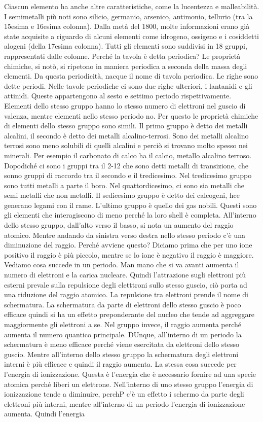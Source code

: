 \documentclass[../AppuntiChimica]{subfiles}
\begin{document}
	Ciascun elemento ha anche altre caratteristiche, come la lucentezza e malleabilità. I semimetalli più noti sono silicio, germanio, arsenico, antimonio, tellurio (tra la 15esima e 16esima colonna). Dalla metà del 1800, molte informazioni erano già state acquisite a riguardo di alcuni elementi come idrogeno, ossigeno e i cosiddetti alogeni (della 17esima colonna). Tutti gli elementi sono suddivisi in 18 gruppi, rappresentati dalle colonne. Perché la tavola è detta periodica? Le proprietà chimiche, si notò, si ripetono in maniera periodica a seconda della massa degli elementi. Da questa periodicità, nacque il nome di tavola periodica. Le righe sono dette periodi. Nelle tavole periodiche ci sono due righe ulteriori, i lantanidi e gli attinidi. Queste appartengono al sesto e settimo periodo rispettivamente. Elementi dello stesso gruppo hanno lo stesso numero di elettroni nel guscio di valenza, mentre elementi nello stesso periodo no. Per questo le proprietà chimiche di elementi dello stesso gruppo sono simili. Il primo gruppo è detto dei metalli alcalini, il secondo è detto dei metalli alcalino-terrosi. Sono dei metalli alcalino terrosi sono meno solubili di quelli alcalini e perciò si trovano molto spesso nei minerali. Per esempio il carbonato di calco ha il calcio, metallo alcalino terroso. Dopodiché ci sono i gruppi tra il 2-12 che sono detti metalli di transizione, che sonno gruppi di raccordo tra il secondo e il tredicesimo. Nel tredicesimo gruppo sono tutti metalli a parte il boro. Nel quattordicesimo, ci sono sia metalli che semi metalli che non metalli. Il sedicesimo gruppo è detto dei calcogeni, hce generano legami con il rame. L'ultimo gruppo è quello dei gas nobili. Questi sono gli elementi che interagiscono di meno perché la loro shell è completa. All'interno dello stesso gruppo, dall'alto verso il basso, si nota un aumento del raggio atomico. Mentre andando da sinistra verso destra nello stesso periodo c'è una diminuzione del raggio. Perché avviene questo? Diciamo prima che per uno ione positivo il raggio è più piccolo, mentre se lo ione è negativo il raggio è maggiore. Vediamo cosa succede in un periodo. Man mano che si va avanti aumenta il numero di elettroni e la carica nucleare. Quindi l'attrazione sugli elettroni più esterni prevale sulla repulsione degli eletttroni sullo stesso guscio, ciò porta ad una riduzione del raggio atomico. La repulsione tra elettroni prende il nome di schermatura. La schermatura da parte di elettroni dello stesso guscio è poco efficace quindi si ha un effetto preponderante del nucleo che tende ad aggreggare maggiormente gli elettroni a se. Nel gruppo invece, il raggio aumenta perché aumenta il numero quantico principale. DUnque, all'interno di un periodo la schermatura è meno efficace perché viene esercitata da elettroni dello stesso guscio. Mentre all'interno dello stesso gruppo la schermatura degli elettroni interni è più efficace e quindi il raggio aumenta. La stessa cosa succede per l'energia di ionizzazione. Questa è l'energia che è necessario fornire ad una specie atomica perché liberi un elettrone. Nell'interno di uno stesso gruppo l'energia di ionizzazione tende a diminuire, perchP c'è un effetto i schermo da parte degli elettroni più interni, mentre all'interno di un periodo l'energia di ionizzazione aumenta. Quindi l'energia 
\end{document}
